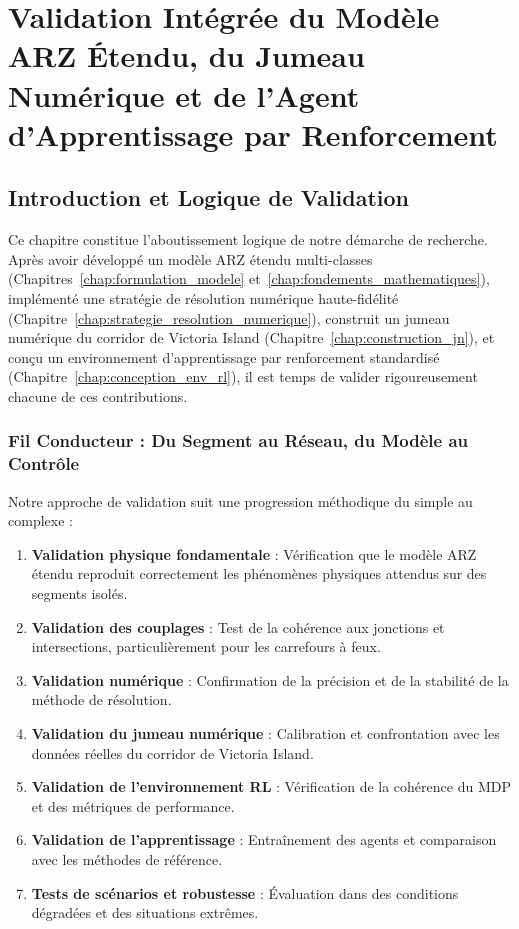 \chapter{Validation Intégrée du Modèle ARZ Étendu, du Jumeau Numérique et de l'Agent d'Apprentissage par Renforcement}
\label{chap:validation_entrainement}

\section{Introduction et Logique de Validation}
\label{sec:intro_logique_validation}

Ce chapitre constitue l'aboutissement logique de notre démarche de recherche. Après avoir développé un modèle ARZ étendu multi-classes (Chapitres~\ref{chap:formulation_modele} et~\ref{chap:fondements_mathematiques}), implémenté une stratégie de résolution numérique haute-fidélité (Chapitre~\ref{chap:strategie_resolution_numerique}), construit un jumeau numérique du corridor de Victoria Island (Chapitre~\ref{chap:construction_jn}), et conçu un environnement d'apprentissage par renforcement standardisé (Chapitre~\ref{chap:conception_env_rl}), il est temps de valider rigoureusement chacune de ces contributions.

\subsection{Fil Conducteur : Du Segment au Réseau, du Modèle au Contrôle}
\label{subsec:fil_conducteur}

Notre approche de validation suit une progression méthodique du simple au complexe :
\begin{enumerate}
    \item \textbf{Validation physique fondamentale} : Vérification que le modèle ARZ étendu reproduit correctement les phénomènes physiques attendus sur des segments isolés.
    \item \textbf{Validation des couplages} : Test de la cohérence aux jonctions et intersections, particulièrement pour les carrefours à feux.
    \item \textbf{Validation numérique} : Confirmation de la précision et de la stabilité de la méthode de résolution.
    \item \textbf{Validation du jumeau numérique} : Calibration et confrontation avec les données réelles du corridor de Victoria Island.
    \item \textbf{Validation de l'environnement RL} : Vérification de la cohérence du MDP et des métriques de performance.
    \item \textbf{Validation de l'apprentissage} : Entraînement des agents et comparaison avec les méthodes de référence.
    \item \textbf{Tests de scénarios et robustesse} : Évaluation dans des conditions dégradées et des situations extrêmes.
\end{enumerate}

